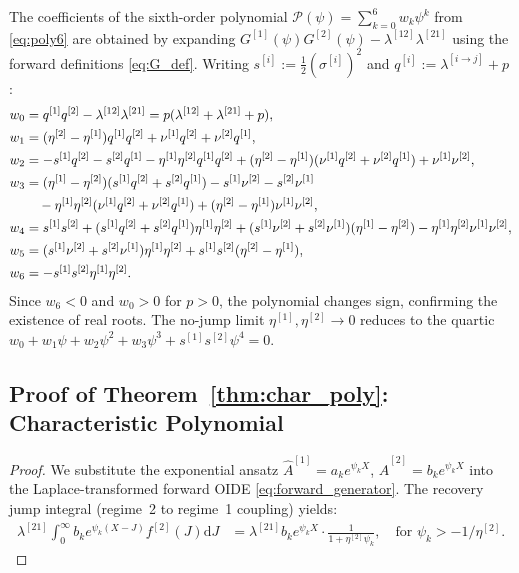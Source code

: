 \documentclass[11pt,a4paper]{article}
\numberwithin{equation}{section}
\newcommand{\dd}{\mathrm{d}}
\begin{document}
\begin{appendices}
The coefficients of the sixth-order polynomial $\mathcal{P}(\psi) = \sum_{k=0}^6 w_k \psi^k$ from \eqref{eq:poly6} are obtained by expanding $G^{[1]}(\psi)G^{[2]}(\psi) - \lambda^{[12]}\lambda^{[21]}$ using the forward definitions \eqref{eq:G_def}. Writing $s^{[i]} := \tfrac{1}{2}(\sigma^{[i]})^2$ and $q^{[i]} := \lambda^{[i\to j]} + p$:
\begin{align}
w_0 &= q^{[1]}q^{[2]} - \lambda^{[12]}\lambda^{[21]} = p(\lambda^{[12]}+\lambda^{[21]}+p), \notag \\
w_1 &= (\eta^{[2]}-\eta^{[1]})q^{[1]}q^{[2]} + \nu^{[1]}q^{[2]} + \nu^{[2]}q^{[1]}, \notag \\
w_2 &= -s^{[1]}q^{[2]} - s^{[2]}q^{[1]} - \eta^{[1]}\eta^{[2]}q^{[1]}q^{[2]} + (\eta^{[2]}-\eta^{[1]})(\nu^{[1]}q^{[2]}+\nu^{[2]}q^{[1]}) + \nu^{[1]}\nu^{[2]}, \notag \\
w_3 &= (\eta^{[1]}-\eta^{[2]})(s^{[1]}q^{[2]}+s^{[2]}q^{[1]}) - s^{[1]}\nu^{[2]} - s^{[2]}\nu^{[1]} \notag \\
&\quad - \eta^{[1]}\eta^{[2]}(\nu^{[1]}q^{[2]}+\nu^{[2]}q^{[1]}) + (\eta^{[2]}-\eta^{[1]})\nu^{[1]}\nu^{[2]}, \notag \\
w_4 &= s^{[1]}s^{[2]} + (s^{[1]}q^{[2]}+s^{[2]}q^{[1]})\eta^{[1]}\eta^{[2]} + (s^{[1]}\nu^{[2]}+s^{[2]}\nu^{[1]})(\eta^{[1]}-\eta^{[2]}) - \eta^{[1]}\eta^{[2]}\nu^{[1]}\nu^{[2]}, \notag \\
w_5 &= (s^{[1]}\nu^{[2]}+s^{[2]}\nu^{[1]})\eta^{[1]}\eta^{[2]} + s^{[1]}s^{[2]}(\eta^{[2]}-\eta^{[1]}), \notag \\
w_6 &= -s^{[1]}s^{[2]}\eta^{[1]}\eta^{[2]}. \label{eq:w_coeffs}
\end{align}
Since $w_6 < 0$ and $w_0 > 0$ for $p > 0$, the polynomial changes sign, confirming the existence of real roots. The no-jump limit $\eta^{[1]}, \eta^{[2]} \to 0$ reduces to the quartic $w_0 + w_1\psi + w_2\psi^2 + w_3\psi^3 + s^{[1]}s^{[2]}\psi^4 = 0$.


\subsection{Proof of Theorem~\ref{thm:char_poly}: Characteristic Polynomial}\label{app:char_poly}

\begin{proof}
We substitute the exponential ansatz $\hat{A}^{[1]} = a_k e^{\psi_k X}$, $\hat{A}^{[2]} = b_k e^{\psi_k X}$ into the Laplace-transformed forward OIDE \eqref{eq:forward_generator}. The recovery jump integral (regime~2 to regime~1 coupling) yields:
\begin{align}
\lambda^{[21]}\!\int_0^{\infty} b_k e^{\psi_k(X-J)} f^{[2]}(J) \dd J &= \lambda^{[21]} b_k e^{\psi_k X} \cdot \frac{1}{1 + \eta^{[2]}\psi_k}, \quad \text{for } \psi_k > -1/\eta^{[2]}.
\end{align}


\end{proof}
\end{appendices}
\end{document}
